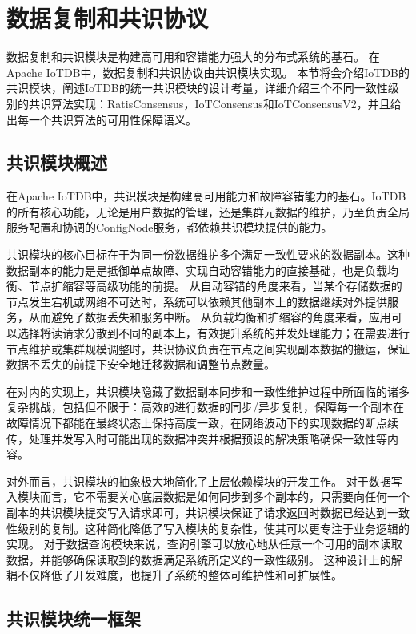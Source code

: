 
\chapter{数据复制和共识协议}

数据复制和共识模块是构建高可用和容错能力强大的分布式系统的基石。
在Apache IoTDB中，数据复制和共识协议由共识模块实现。
本节将会介绍IoTDB的共识模块，阐述IoTDB的统一共识模块的设计考量，详细介绍三个不同一致性级别的共识算法实现：RatisConsensus，IoTConsensus和IoTConsensusV2，并且给出每一个共识算法的可用性保障语义。


\section{共识模块概述}

在Apache IoTDB中，共识模块是构建高可用能力和故障容错能力的基石。IoTDB的所有核心功能，无论是用户数据的管理，还是集群元数据的维护，乃至负责全局服务配置和协调的ConfigNode服务，都依赖共识模块提供的能力。

共识模块的核心目标在于为同一份数据维护多个满足一致性要求的数据副本。这种数据副本的能力是是抵御单点故障、实现自动容错能力的直接基础，也是负载均衡、节点扩缩容等高级功能的前提。
从自动容错的角度来看，当某个存储数据的节点发生宕机或网络不可达时，系统可以依赖其他副本上的数据继续对外提供服务，从而避免了数据丢失和服务中断。
从负载均衡和扩缩容的角度来看，应用可以选择将读请求分散到不同的副本上，有效提升系统的并发处理能力；在需要进行节点维护或集群规模调整时，共识协议负责在节点之间实现副本数据的搬运，保证数据不丢失的前提下安全地迁移数据和调整节点数量。

在对内的实现上，共识模块隐藏了数据副本同步和一致性维护过程中所面临的诸多复杂挑战，包括但不限于：高效的进行数据的同步/异步复制，保障每一个副本在故障情况下都能在最终状态上保持高度一致，在网络波动下的实现数据的断点续传，处理并发写入时可能出现的数据冲突并根据预设的解决策略确保一致性等内容。

对外而言，共识模块的抽象极大地简化了上层依赖模块的开发工作。
对于数据写入模块而言，它不需要关心底层数据是如何同步到多个副本的，只需要向任何一个副本的共识模块提交写入请求即可，共识模块保证了请求返回时数据已经达到一致性级别的复制。这种简化降低了写入模块的复杂性，使其可以更专注于业务逻辑的实现。
对于数据查询模块来说，查询引擎可以放心地从任意一个可用的副本读取数据，并能够确保读取到的数据满足系统所定义的一致性级别。
这种设计上的解耦不仅降低了开发难度，也提升了系统的整体可维护性和可扩展性。


\section{共识模块统一框架}

